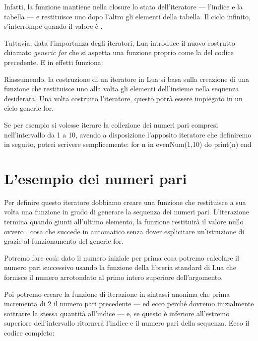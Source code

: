 Infatti, la funzione  mantiene nella closure lo stato
dell'iteratore --- l'indice  e la tabella  --- e restituisce uno
dopo l'altro gli elementi della tabella. Il ciclo  infinito,
s'interrompe quando il valore è .

Tuttavia, data l'importanza degli iteratori, Lua introduce il nuovo costrutto
chiamato \emph{generic for} che si aspetta una funzione proprio come la
 del codice precedente. E in effetti funziona:

Riassumendo, la costruzione di un iteratore in Lua si basa sulla creazione di
una funzione che restituisce uno alla volta gli elementi dell'insieme nella
sequenza desiderata. Una volta costruito l'iteratore, questo potrà essere
impiegato in un ciclo generic for.

Se per esempio si volesse iterare la collezione dei numeri pari compresi
nell'intervallo da 1 a 10, avendo a disposizione l'apposito iteratore
 che definiremo in seguito, potrei scrivere semplicemente:
\lines
for n in evenNum(1,10) do
    print(n)
end
\endlines
{}


\section{L'esempio dei numeri pari}

Per definire questo iteratore dobbiamo creare una funzione che restituisce a
sua volta una funzione in grado di generare la sequenza dei numeri pari.
L'iterazione termina quando giunti all'ultimo elemento, la funzione restituirà
il valore nullo ovvero , cosa che succede in automatico senza dover
esplicitare un'istruzione di  grazie al funzionamento del generic
for.

Potremo fare così: dato il numero iniziale per prima cosa potremo calcolare il
numero pari successivo usando la funzione della libreria standard di Lua
 che fornisce il numero arrotondato al primo intero superiore
dell'argomento.

Poi potremo creare la funzione di iterazione in sintassi anonima che prima
incrementa di 2 il numero pari precedente --- ed ecco perché dovremo
inizialmente sottrarre la stessa quantità all'indice --- e, se questo è
inferiore all'estremo superiore dell'intervallo ritornerà l'indice e il numero
pari della sequenza. Ecco il codice completo:

